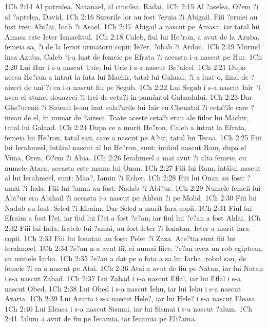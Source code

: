 1Ch 2:14  Al patrulea, Natanael, al cincilea, Radai,
1Ch 2:15  Al ?aselea, O?em ?i al ?aptelea, David.
1Ch 2:16  Surorile lor au fost ?eruia ?i Abigail. Fiii ?eruiei au fost trei: Abi?ai, Ioab ?i Asael.
1Ch 2:17  Abigail a nascut pe Amasa; iar tatal lui Amasa este Ieter Ismaelitul.
1Ch 2:18  Caleb, fiul lui He?ron, a avut de la Azuba, femeia sa, ?i de la Ieriot urmatorii copii: Ie?er, ?obab ?i Ardon.
1Ch 2:19  Murind însa Azuba, Caleb ?i-a luat de femeie pe Efrata ?i aceasta i-a nascut pe Hur.
1Ch 2:20  Lui Hur i s-a nascut Urie; lui Urie i s-a nascut Be?aleel.
1Ch 2:21  Dupa aceea He?ron a intrat la fata lui Machir, tatal lui Galaad; ?i a luat-o, fiind de ?aizeci de ani ?i ea i-a nascut fiu pe Segub.
1Ch 2:22  Lui Segub i s-a nascut Iair ?i avea el atunci douazeci ?i trei de ceta?i în pamântul Galaadului.
1Ch 2:23  Dar Ghe?urenii ?i Sirienii le-au luat sala?urile lui Iair cu Chenatul ?i ceta?ile care ?ineau de el, în numar de ?aizeci. Toate aceste ceta?i erau ale fiilor lui Machir, tatal lui Galaad.
1Ch 2:24  Dupa ce a murit He?ron, Caleb a intrat la Efrata, femeia lui He?ron, tatal sau, care a nascut pe A?ur, tatal lui Tecoa.
1Ch 2:25  Fiii lui Ierahmeel, întâiul nascut al lui He?ron, sunt: întâiul nascut Ram, dupa el Vuna, Oren, O?em ?i Ahia.
1Ch 2:26  Ierahmeel a mai avut ?i alta femeie, cu numele Atara; aceasta este mama lui Onan.
1Ch 2:27  Fiii lui Ram, întâiul nascut al lui Ierahmeel, sunt: Maa?, Iamin ?i Echer.
1Ch 2:28  Fiii lui Onan au fost: ?amai ?i Iada. Fiii lui ?amai au fost: Nadab ?i Abi?ur.
1Ch 2:29  Numele femeii lui Abi?ur era Abihail ?i aceasta i-a nascut pe Ahban ?i pe Molid.
1Ch 2:30  Fiii lui Nadab au fost: Seled ?i Efraim. Dar Seled a murit fara copii.
1Ch 2:31  Fiul lui Efraim a fost I?ei, iar fiul lui I?ei a fost ?e?an; iar fiul lui ?e?an a fost Ahlai.
1Ch 2:32  Fiii lui Iada, fratele lui ?amai, au fost Ieter ?i Ionatan. Ieter a murit fara copii.
1Ch 2:33  Fiii lui Ionatan au fost: Pelet ?i Zaza. Ace?tia sunt fiii lui Ierahmeel.
1Ch 2:34  ?e?an n-a avut fii, ci numai fiice. ?e?an avea un rob egiptean, cu numele Iarha.
1Ch 2:35  ?e?an a dat pe o fata a sa lui Iarha, robul sau, de femeie ?i ea a nascut pe Atai.
1Ch 2:36  Atai a avut de fiu pe Natan, iar lui Natan i s-a nascut Zabad.
1Ch 2:37  Lui Zabad i s-a nascut Eflal, iar lui Eflal i s-a nascut Obed.
1Ch 2:38  Lui Obed i s-a nascut Iehu, iar lui Iehu i s-a nascut Azaria.
1Ch 2:39  Lui Azaria i s-a nascut Hele?, iar lui Hele? i s-a nascut Eleasa.
1Ch 2:40  Lui Eleasa i s-a nascut Sismai, iar lui Sismai i s-a nascut ?alum.
1Ch 2:41  ?alum a avut de fiu pe Iecamia, iar Iecamia pe Eli?ama.
